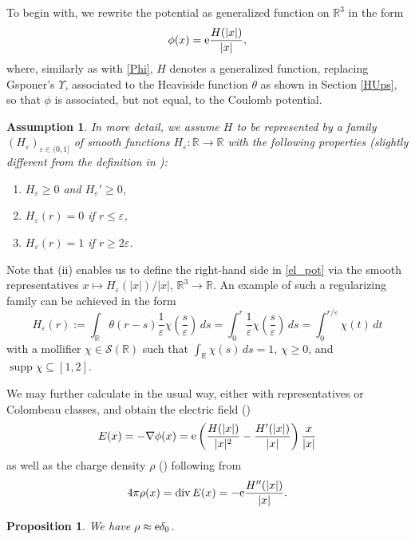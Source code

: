 \documentclass[sumlimits,intlimits,namelimits%
]{amsart}
\renewcommand{\S}{\mathscr{S}}
\newcommand{\mb}[1]{\ensuremath{\mathbb{#1}}}
\newcommand{\R}{\mb{R}}
\renewcommand{\div}{\mathop{\mathrm{div}}}
\newtheorem{proposition}[theorem]{Proposition}
\newtheorem{assumption}[theorem]{Assumption}
\theoremstyle{definition}
\newcommand{\beq}{\begin{equation}}
\newcommand{\eeq}{\end{equation}}
\newcommand{\col}{\colon}
\newcommand{\de}{\delta}
\newcommand{\eps}{\varepsilon}
\newcommand{\supp}{\mathop{\mathrm{supp}}}
\newcommand{\e}{\textup{e}}
\begin{document}
To begin with, we rewrite the potential \cite[Equation (6.1)]{GsponerJMP} as generalized function on $\R^3$ in the form
\beq\label{el_pot}
 \phi(x) = \e \frac{H(|x|)}{|x|},
\eeq
where, similarly as with \eqref{Phi}, $H$ denotes a generalized function, replacing Gsponer's $\Upsilon$, associated to the Heaviside function $\theta$ as shown in Section \ref{HUps}, so that $\phi$ is associated, but not equal, to the Coulomb potential. 

\begin{assumption}\label{AssH}
In more detail, we assume $H$ to be represented  by a family $(H_\eps)_{\eps \in (0,1]}$ of smooth functions $H_\eps \col \R \to \R$ with the following properties (slightly different from the definition in \cite[Subsection 3.3.1]{Colombeau:92}): 
\begin{enumerate}

\item[(i)] $H_\eps \geq 0$ and $H_\eps' \geq 0$,

\item[(ii)] $H_\eps(r) = 0$ if $r \leq \eps$, 

\item[(iii)] $H_\eps(r) = 1$ if $r \geq 2 \eps$.

\end{enumerate}
\end{assumption}

Note that (ii) enables us to define the right-hand side in \eqref{el_pot} via the smooth representatives $x \mapsto H_\eps(|x|)/|x|$, $\R^3 \to \R$. An example of such a regularizing family can be achieved in the form 
$$
   H_\eps(r) := \int_\R \theta(r-s) \frac{1}{\eps} \chi\left(\frac{s}{\eps}\right) \, d s =  
       \int_0^r \frac{1}{\eps} \chi\left(\frac{s}{\eps}\right) \, d s = \int_0^{r/\eps} \chi(t) \, d t
$$ 
with a mollifier $\chi \in \S(\R)$ such that $\int_\R \chi(s) \, ds = 1$, $\chi \geq 0$, and $\supp \chi \subseteq [1,2]$.

We may further calculate in the usual way, either with representatives or Colombeau classes, and obtain the electric field (\cite[Equation (6.2)]{GsponerJMP})
$$
   E(x) = - \nabla \phi(x) = \e \left( \frac{H(|x|)}{|x|^2}  - \frac{H'(|x|)}{|x|}\right) \frac{x}{|x|}
$$ 
as well as the charge density $\rho$ (\cite[Equation (6.3)]{GsponerJMP}) following from
$$
  4 \pi \rho(x) = \div E(x) = - \e \frac{H''(|x|)}{|x|}.
$$

\begin{proposition} We have $\rho \approx \e \de_0$.
\end{proposition}
\end{document}
